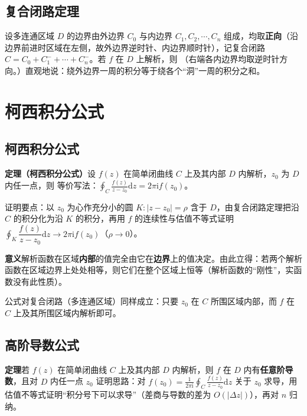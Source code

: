\subsection{复合闭路定理}
设多连通区域 \(D\) 的边界由外边界 \(C_{0}\) 与内边界 \(C_{1},C_{2},\cdots,C_{n}\) 组成，均取\textbf{正向}（沿边界前进时区域在左侧，故外边界逆时针、内边界顺时针），记复合闭路 \(C=C_{0}+C_{1}^{-}+\cdots+C_{n}^{-}\)。若 \(f\) 在 \(D\) 上解析，则
（右端各内边界均取逆时针方向。）直观地说：绕外边界一周的积分等于绕各个“洞”一周的积分之和。


\section{柯西积分公式}

\subsection{柯西积分公式}
\textbf{定理（柯西积分公式）}\quad 设 \(f(z)\) 在简单闭曲线 \(C\) 上及其内部 \(D\) 内解析，\(z_{0}\) 为 \(D\) 内任一点，则
等价写法：\(\displaystyle\oint_{C}\frac{f(z)}{z-z_{0}}\mathrm{d}z=2\pi\mathrm{i}f(z_{0})\)。

证明要点：以 \(z_{0}\) 为心作充分小的圆 \(K:|z-z_{0}|=\rho\) 含于 \(D\)，由复合闭路定理把沿 \(C\) 的积分化为沿 \(K\) 的积分，再用 \(f\) 的连续性与估值不等式证明
\(\oint_{K}\dfrac{f(z)}{z-z_{0}}\mathrm{d}z\to 2\pi\mathrm{i}f(z_{0})\)（\(\rho\to 0\)）。

\textbf{意义}\quad 解析函数在区域\textbf{内部}的值完全由它在\textbf{边界}上的值决定。由此立得：若两个解析函数在区域边界上处处相等，则它们在整个区域上恒等（解析函数的“刚性”，实函数没有此性质）。

公式对复合闭路（多连通区域）同样成立：只要 \(z_{0}\) 在 \(C\) 所围区域内部，而 \(f\) 在 \(C\) 上及其所围区域内解析即可。

\subsection{高阶导数公式}
\textbf{定理}\quad 若 \(f(z)\) 在简单闭曲线 \(C\) 上及其内部 \(D\) 内解析，则 \(f\) 在 \(D\) 内有\textbf{任意阶导数}，且对 \(D\) 内任一点 \(z_{0}\)
证明思路：对 \(f(z_{0})=\frac{1}{2\pi\mathrm{i}}\oint_{C}\frac{f(z)}{z-z_{0}}\mathrm{d}z\) 关于 \(z_{0}\) 求导，用估值不等式证明“积分号下可以求导”（差商与导数的差为 \(O(|\Delta z|)\)），再对 \(n\) 归纳。

